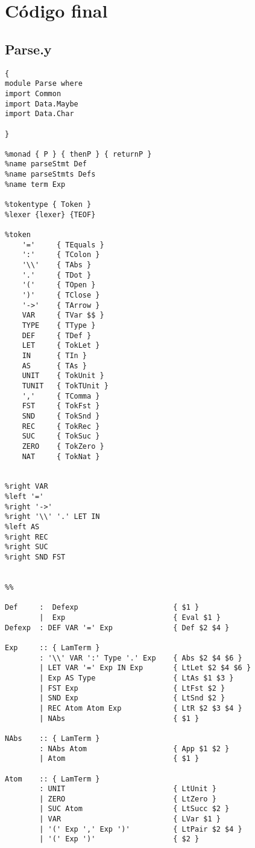 \documentclass[a4paper]{article}
\begin{document}
\section*{C\'odigo final}
\subsection*{Parse.y}

\begin{lstlisting}
{
module Parse where
import Common
import Data.Maybe
import Data.Char

}

%monad { P } { thenP } { returnP }
%name parseStmt Def
%name parseStmts Defs
%name term Exp

%tokentype { Token }
%lexer {lexer} {TEOF}

%token
    '='     { TEquals }
    ':'     { TColon }
    '\\'    { TAbs }
    '.'     { TDot }
    '('     { TOpen }
    ')'     { TClose }
    '->'    { TArrow }
    VAR     { TVar $$ }
    TYPE    { TType }
    DEF     { TDef }
    LET     { TokLet }
    IN      { TIn }
    AS      { TAs }
    UNIT    { TokUnit }
    TUNIT   { TokTUnit }
    ','     { TComma }
    FST     { TokFst }
    SND     { TokSnd }
    REC     { TokRec }
    SUC     { TokSuc }
    ZERO    { TokZero }
    NAT     { TokNat }
    

%right VAR
%left '=' 
%right '->'
%right '\\' '.' LET IN
%left AS 
%right REC
%right SUC
%right SND FST


%%

Def     :  Defexp                      { $1 }
        |  Exp                         { Eval $1 }
Defexp  : DEF VAR '=' Exp              { Def $2 $4 } 

Exp     :: { LamTerm }
        : '\\' VAR ':' Type '.' Exp    { Abs $2 $4 $6 }
        | LET VAR '=' Exp IN Exp       { LtLet $2 $4 $6 }
        | Exp AS Type                  { LtAs $1 $3 }
        | FST Exp                      { LtFst $2 }
        | SND Exp                      { LtSnd $2 }
        | REC Atom Atom Exp            { LtR $2 $3 $4 }
        | NAbs                         { $1 }
        
NAbs    :: { LamTerm }
        : NAbs Atom                    { App $1 $2 }
        | Atom                         { $1 }

Atom    :: { LamTerm }
        : UNIT                         { LtUnit }
        | ZERO                         { LtZero }
        | SUC Atom                     { LtSucc $2 }
        | VAR                          { LVar $1 }
        | '(' Exp ',' Exp ')'          { LtPair $2 $4 }
        | '(' Exp ')'                  { $2 }


\end{lstlisting}
\end{document}
